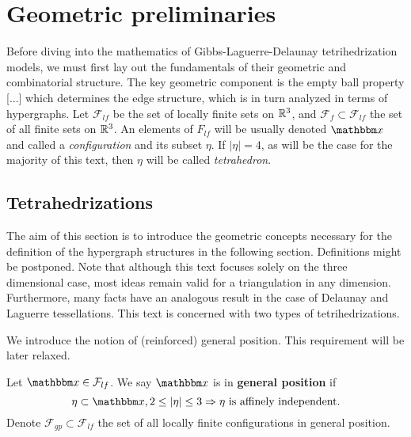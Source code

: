 \chapter{Geometric preliminaries}
Before diving into the mathematics of Gibbs-Laguerre-Delaunay tetrihedrization models, we must first lay out the fundamentals of their geometric and combinatorial structure. The key geometric component is the empty ball property [...] which determines the edge structure, which is in turn analyzed in terms of hypergraphs.
Let $\mathcal F_{lf}$ be the set of locally finite sets on ${\mathbb R^3}$, and $\mathcal F_{f} \subset \mathcal F_{lf}$ the set of all finite sets on ${\mathbb R^3}$. An elements of $F_{lf}$ will be usually denoted $\x$ and called a \textit{configuration} and its subset $\eta$. If $|\eta|=4$, as will be the case for the majority of this text, then $\eta$ will be called \textit{tetrahedron}.


\section{Tetrahedrizations}\label{sec:tetrahedrizations}
The aim of this section is to introduce the geometric concepts necessary for the definition of the hypergraph structures in the following section. Definitions might be postponed. Note that although this text focuses solely on the three dimensional case, most ideas remain valid for a triangulation in any dimension. Furthermore, many facts have an analogous result in the case of Delaunay and Laguerre tessellations.
This text is concerned with two types of tetrihedrizations. 

We introduce the notion of (reinforced) general position. This requirement will be later relaxed.

\begin{definition}
Let $\x \in \mathcal F_{lf}$. We say $\x$ is in \textbf{general position} if 
$$ \eta \subset \x, 2 \leq |\eta| \leq 3 \Rightarrow \eta \text{ is affinely independent.} $$   
Denote $\mathcal F_{gp}\subset \mathcal F_{lf}$ the set of all locally finite configurations in general position.
\end{definition}
 

